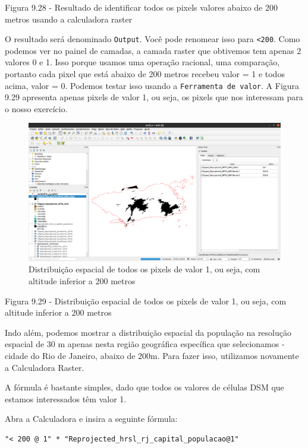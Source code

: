 \documentclass[
]{book}
\begin{document}
Figura 9.28 - Resultado de identificar todos os pixels valores abaixo de 200 metros usando a calculadora raster

O resultado será denominado \texttt{Output}. Você pode renomear isso para \texttt{\textless{}200}. Como podemos ver no painel de camadas, a camada raster que obtivemos tem apenas 2 valores 0 e 1. Isso porque usamos uma operação racional, uma comparação, portanto cada pixel que está abaixo de 200 metros recebeu valor = 1 e todos acima, valor = 0. Podemos testar isso usando a \texttt{Ferramenta\ de\ valor}. A Figura 9.29 apresenta apenas pixels de valor 1, ou seja, os pixels que nos interessam para o nosso exercício.

\begin{figure}
\centering
\includegraphics{media/modulo9/fig929.png}
\caption{Distribuição espacial de todos os pixels de valor 1, ou seja, com altitude inferior a 200 metros}
\end{figure}

Figura 9.29 - Distribuição espacial de todos os pixels de valor 1, ou seja, com altitude inferior a 200 metros

Indo além, podemos mostrar a distribuição espacial da população na resolução espacial de 30 m apenas nesta região geográfica específica que selecionamos - cidade do Rio de Janeiro, abaixo de 200m. Para fazer isso, utilizamos novamente a Calculadora Raster.

A fórmula é bastante simples, dado que todos os valores de células DSM que estamos interessados \hspace{0pt}\hspace{0pt}têm valor 1.

Abra a Calculadora e insira a seguinte fórmula:

\begin{verbatim}
"< 200 @ 1" * "Reprojected_hrsl_rj_capital_populacao@1"
\end{verbatim}
\end{document}
